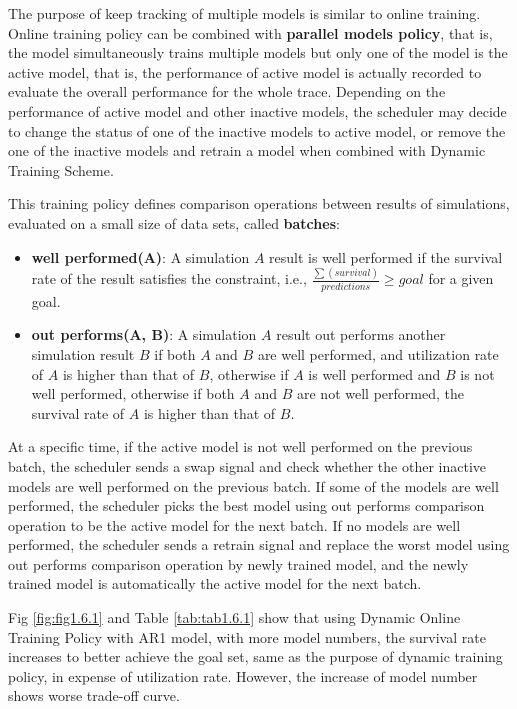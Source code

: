 \documentclass{article}
\begin{document}
\begin{flushleft}
The purpose of keep tracking of multiple models is similar to online training.
Online training policy can be combined with \textbf{parallel models policy},
that is, the model simultaneously trains multiple models but only one of the
model is the active model, that is, the performance of active model is actually
recorded to evaluate the overall performance for the whole trace. Depending on
the performance of active model and other inactive models, the scheduler may
decide to change the status of one of the inactive models to active model, or
remove the one of the inactive models and retrain a model when combined with
Dynamic Training Scheme.

This training policy defines comparison operations between results of
simulations, evaluated on a small size of data sets, called \textbf{batches}:

\begin{itemize}
    \item \textbf{well performed(A)}: A simulation $A$ result is well performed
    if the survival rate of the result satisfies the constraint, i.e.,
    $\frac{\sum(survival)}{predictions} \geq goal$ for a given goal.
    \item \textbf{out performs(A, B)}: A simulation $A$ result out performs
    another simulation result $B$ if both $A$ and $B$ are well performed, and
    utilization rate of $A$ is higher than that of $B$, otherwise if $A$ is well
    performed and $B$ is not well performed, otherwise if both $A$ and $B$ are
    not well performed, the survival rate of $A$ is higher than that of $B$.
\end{itemize}

At a specific time, if the active model is not well performed on the previous
batch, the scheduler sends a swap signal and check whether the other inactive
models are well performed on the previous batch. If some of the models are well
performed, the scheduler picks the best model using out performs comparison
operation to be the active model for the next batch. If no models are well
performed, the scheduler sends a retrain signal and replace the worst model
using out performs comparison operation by newly trained model, and the newly
trained model is automatically the active model for the next batch.

Fig \ref{fig:fig1.6.1} and Table \ref{tab:tab1.6.1} show that using Dynamic
Online Training Policy with AR1 model, with more model numbers, the survival
rate increases to better achieve the goal set, same as the purpose of dynamic
training policy, in expense of utilization rate. However, the increase of model
number shows worse trade-off curve.


\end{flushleft}
\end{document}
